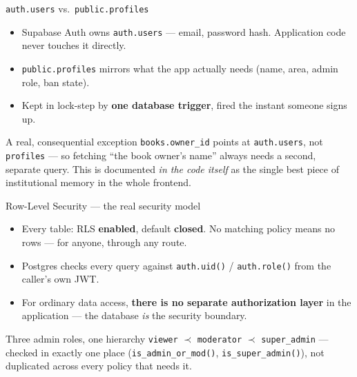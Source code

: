 \documentclass[aspectratio=169,11pt]{beamer}
\newcommand{\code}[1]{\textcolor{olkTealDark}{\texttt{#1}}}
\begin{document}
\begin{frame}{\code{auth.users} vs.\ \code{public.profiles}}
  \begin{itemize}
    \item Supabase Auth owns \code{auth.users} --- email, password hash. Application code never touches it directly.
    \item \code{public.profiles} mirrors what the app actually needs (name, area, admin role, ban state).
    \item Kept in lock-step by \textbf{one database trigger}, fired the instant someone signs up.
  \end{itemize}
  \vfill
  \begin{alertblock}{A real, consequential exception}
    \code{books.owner\_id} points at \code{auth.users}, not \code{profiles} --- so fetching ``the book owner's name'' always needs a second, separate query. This is documented \emph{in the code itself} as the single best piece of institutional memory in the whole frontend.
  \end{alertblock}
\end{frame}

\begin{frame}{Row-Level Security --- the real security model}
  \begin{itemize}
    \item Every table: RLS \textbf{enabled}, default \textbf{closed}. No matching policy means no rows --- for anyone, through any route.
    \item Postgres checks every query against \code{auth.uid()} / \code{auth.role()} from the caller's own JWT.
    \item For ordinary data access, \textbf{there is no separate authorization layer} in the application --- the database \emph{is} the security boundary.
  \end{itemize}
  \vfill
  \begin{block}{Three admin roles, one hierarchy}
    \code{viewer} $\prec$ \code{moderator} $\prec$ \code{super\_admin} --- checked in exactly one place (\code{is\_admin\_or\_mod()}, \code{is\_super\_admin()}), not duplicated across every policy that needs it.
  \end{block}
\end{frame}
\end{document}
